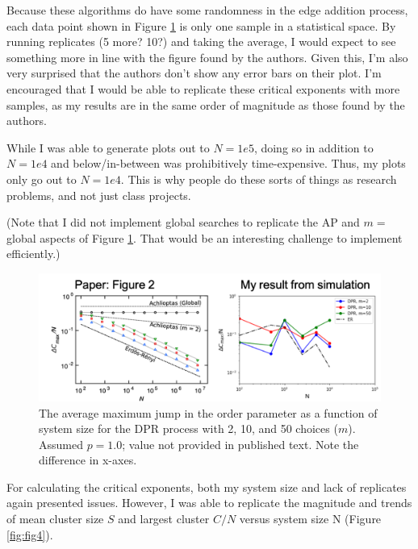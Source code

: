 \documentclass[11pt]{article}   	%
\begin{document}
Because these algorithms do have some randomness in the edge addition process, each data point shown in Figure \ref{fig:fig2} is only one sample in a statistical space. By running replicates (5 more? 10?) and taking the average, I would expect to see something more in line with the figure found by the authors. Given this, I'm also very surprised that the authors don't show any error bars on their plot. I'm encouraged that I would be able to replicate these critical exponents with more samples, as my results are in the same order of magnitude as those found by the authors.

While I was able to generate plots out to $N=1e5$, doing so in addition to $N=1e4$ and below/in-between was prohibitively time-expensive. Thus, my plots only go out to $N=1e4$. This is why people do these sorts of things as research problems, and not just class projects.

(Note that I did not implement global searches to replicate the AP and $m=$global aspects of Figure \ref{fig:fig2}. That would be an interesting challenge to implement efficiently.)

\begin{figure}[t]
\begin{center}
\includegraphics[width=\textwidth]{fig/fig2_comparison.png}
\caption{The average maximum jump in the order parameter as a function of system size for the DPR process with 2, 10, and 50 choices ($m$). Assumed $p=1.0$; value not provided in published text. Note the difference in x-axes.}
\label{fig:fig2}
\end{center}
\end{figure}

For calculating the critical exponents, both my system size and lack of replicates again presented issues. However, I was able to replicate the magnitude and trends of mean cluster size $S$ and largest cluster $C/N$ versus system size N (Figure \ref{fig:fig4}).
\end{document}
